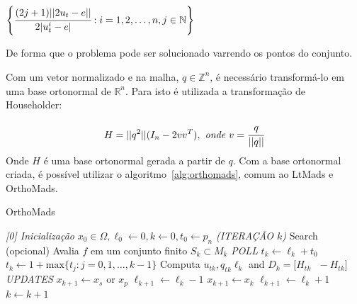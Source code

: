\begin{center}
$ \left \{ \cfrac{(2j+1)||2u_t - e||}{2|u^i_t - e|} : i = 1,2,\dots,n,j \in \mathbb{N} \right \}$
\end{center}
De forma que o problema pode ser solucionado varrendo os pontos do conjunto.

Com um vetor normalizado e na malha, $q \in \mathbb{Z}^n$, é necessário transformá-lo em uma base ortonormal de $\mathbb{R}^n$. Para isto é utilizada a transformação de Householder:

\begin{equation}
H = ||q^2||(I_n - 2vv^T),\textit{ onde }v = \cfrac{q}{||q||}
\end{equation}
Onde $H$ é uma base ortonormal gerada a partir de $q$.
%
Com a base ortonormal criada, é possível utilizar o algoritmo~\ref{alg:orthomads}, comum ao LtMads e OrthoMads.


\begin{algorithm}
    \caption{OrthoMads}
    \label{alg:orthomads}
    \begin{algorithmic}[1] %
\BState \emph{[0] Inicialização}   
                \State $x_0 \in \Omega , \ell_0 \gets 0, k \gets 0, t_0 \gets p_n$ 
\BState \emph{(ITERAÇÃO $k$)}                
            \State Search (opcional)
			\State Avalia $ f $ em um conjunto finito $S_k \subset M_k $
\State \emph{POLL}
    \State $t_k \gets \ell_k + t_0$
    \State $t_k \gets 1 + \text{max} \{t_j:j=0,1,\dots,k-1\}$
    \EndIf
    \State Computa $ u_{tk} , q_{tk}   \ell_k $ and $ D_k = \big[ H_{tk} \text{    } -H_{tk} \big] $
\BState \emph{UPDATES}                
		\State $x_{k+1} \gets x_s $ or $x_p$
		\State $\ell_{k+1} \gets \ell_k - 1$
		\State $x_{k+1} \gets x_k$
		\State $\ell_{k+1} \gets \ell_k + 1$
    \EndIf
    \State $k \gets k + 1$
    \EndWhile
    \end{algorithmic}
\end{algorithm}




